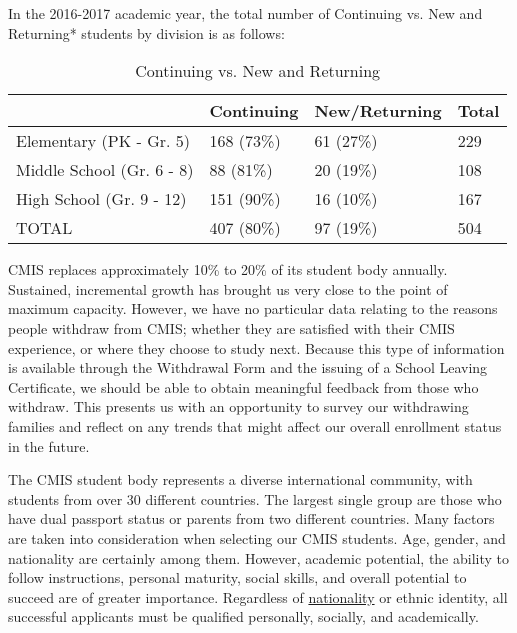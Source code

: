 In the 2016-2017 academic year, the total number of Continuing vs. New and Returning* students by division is as follows:

\begin{table}[h]
\caption{Continuing vs. New and Returning}
\label{table:2}
\begin{tabu}{|X[2]|X|X|X|}
\hline
&
Continuing&
New/Returning&
Total\\
\hline
Elementary (PK - Gr. 5)&
168 (73\%)&
61 (27\%)&
229\\
\hline
Middle School (Gr. 6 - 8)&
88 (81\%)&
20 (19\%)&
108\\
\hline
High School (Gr. 9 - 12)&
151 (90\%)&
16 (10\%)&
167\\
\hline
TOTAL&
407 (80\%)&
97 (19\%)&
504\\
\hline
\end{tabu}
\end{table}


CMIS replaces approximately 10\% to 20\% of its student body annually.  Sustained, incremental growth has brought us very close to the point of maximum capacity.  However, we have no particular data relating to the reasons people withdraw from CMIS; whether they are satisfied with their CMIS experience, or where they choose to study next.  Because this type of information is available through the Withdrawal Form and the issuing of a School Leaving Certificate, we should be able to obtain meaningful feedback from those who withdraw.  This presents us with an opportunity to survey our withdrawing families and reflect on any trends that might affect our overall enrollment status in the future. 


The CMIS student body represents a diverse international community, with students from over 30 different countries.  The largest single group are those who have dual passport status or parents from two different countries.  Many factors are taken into consideration when selecting our CMIS students.  Age, gender, and nationality are certainly among them.  However, academic potential, the ability to follow instructions, personal maturity, social skills, and overall potential to succeed are of greater importance.  Regardless of \href{https://docs.google.com/spreadsheets/d/15wjkZ9Yy__KpVuhKlawJuoMAAlCE6FMBsOJMKjXacYA/edit?ts=579eee90#gid=0}{nationality} or ethnic identity, all successful applicants must be qualified personally, socially, and academically.  

